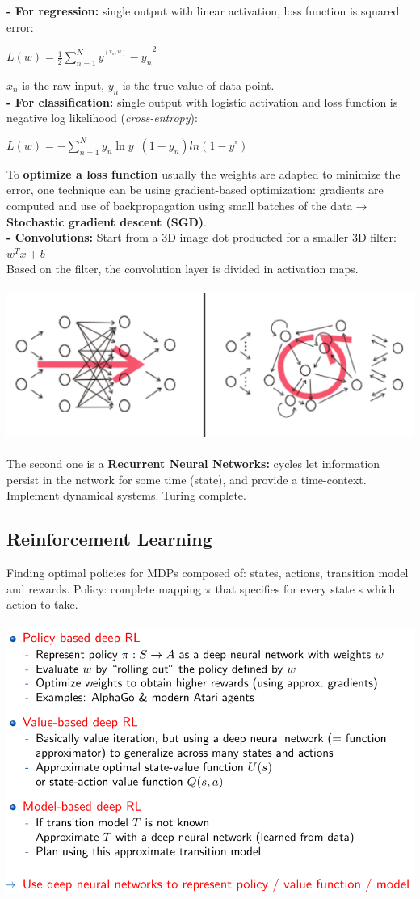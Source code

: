 \documentclass{article}
\begin{document}
\textbf{- For regression: }single output with linear activation, loss function is squared error:
\begin{center}
$L(w)=\frac{1}{2}\sum_{n=1}^N{y^^(x_n,w)-y_n}^2$
\end{center}
$x_n$ is the raw input, $y_n$ is the true value of data point.\\
\textbf{- For classification: }single output with logistic activation and loss function is negative log likelihood (\textit{cross-entropy}):
\begin{center}
$L(w)=-\sum_{n=1}^N{y_n\ln y^^ +(1-y_n)ln(1-y^^ _n)}$
\end{center}
To \textbf{optimize a loss function} usually the weights are adapted to minimize the error, one technique can be using gradient-based optimization: gradients are computed and use of backpropagation using small batches of the data$\rightarrow$ \textbf{Stochastic gradient descent (SGD)}.\\
\textbf{- Convolutions: } Start from a 3D image dot producted for a smaller 3D filter: $w^Tx+b$\\
Based on the filter, the convolution layer is divided in activation maps.\\\\
\includegraphics[scale=0.3]{95.png}\\\\
The second one is a \textbf{Recurrent Neural Networks: }cycles let information persist in the network for some time (state), and provide a time-context. Implement dynamical systems. Turing complete.
\subsection{Reinforcement Learning}
Finding optimal policies for MDPs composed of: states, actions, transition model and rewards. Policy: complete mapping $\pi$ that specifies for every state s which action to take.\\\\
\includegraphics[scale=0.3]{96.png}
\end{document}
